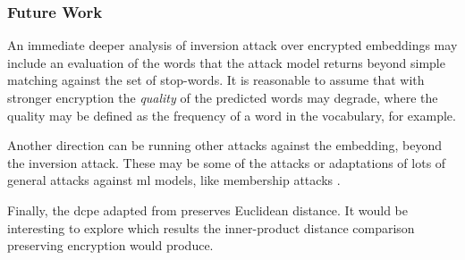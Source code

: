		\subsubsection{Future Work}

			An immediate deeper analysis of inversion attack over encrypted embeddings may include an evaluation of the words that the attack model returns beyond simple matching against the set of stop-words.
			It is reasonable to assume that with stronger encryption the \emph{quality} of the predicted words may degrade, where the quality may be defined as the frequency of a word in the vocabulary, for example.

			Another direction can be running other attacks against the embedding, beyond the inversion attack.
			These may be some of the \textcite{embedding-attacks} attacks or adaptations of lots of general attacks against \acrshort{ml} models, like membership attacks \cite{membership-attacks,enhanced-membership-attacks}.

			Finally, the \acrshort{dcpe} adapted from \cite{dcpe} preserves Euclidean distance.
			It would be interesting to explore which results the inner-product distance comparison preserving encryption would produce.
